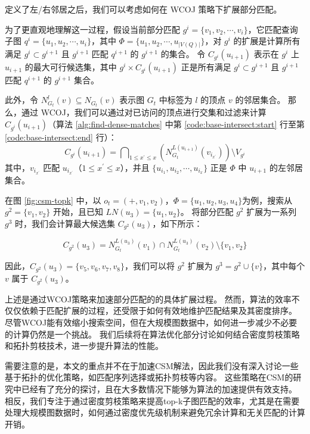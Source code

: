 定义了左/右邻居之后，我们可以考虑如何在 WCOJ 策略下扩展部分匹配。

为了更直观地理解这一过程，假设当前部分匹配 $g^i = \{v_1, v_2, \cdots, v_i\}$，它匹配查询子图 $q^i = \{u_1, u_2, \cdots, u_i\}$，其中 $\Phi = \{u_1, u_2, \cdots, u_{|V(Q)|}\}$，对 $g^i$ 的扩展是计算所有满足 $g^i \subset g^{i+1}$ 且 $g^{i+1}$ 匹配 $q^{i+1}$ 的 $g^{i+1}$ 的集合。
令 $C_{g^{i}}(u_{i+1})$ 表示在 $g^i$ 上 $u_{i+1}$ 的最大可行候选集，其中 $g^i \times C_{g^{i}}(u_{i+1})$ 正是所有满足 $g^i \subset g^{i+1}$ 且 $g^{i+1}$ 匹配 $q^{i+1}$ 的 $g^{i+1}$ 集合。

此外，令 $N_{G_t}^l(v) \subseteq N_{G_t}(v)$ 表示图 $G_t$ 中标签为 $l$ 的顶点 $v$ 的邻居集合。
那么，通过 WCOJ，我们可以通过对已访问的顶点进行交集和过滤来计算 $C_{g^{i}}(u_{i+1})$（算法 \ref{alg:find-dense-matches} 中第 \ref{code:base-intersect:start} 行至第 \ref{code:base-intersect:end} 行）：
\begin{equation} \label{equation:wcoj-intersection}
    C_{g^{i}}(u_{i+1}) = \bigcap\nolimits_{1\leq x^\prime\leq x} \left(  N_{G_t}^{L(u_{i+1})}(v_{i_{x^\prime}}) \right)  \setminus V_{g^i}
\end{equation}
其中，$v_{i_{x^\prime}}$ 匹配 $u_{i_{x^\prime}}$（$1 \leq x^\prime \leq x$），并且 $\{u_{i_1}, u_{i_2}, \cdots, u_{i_x}\}$ 正是 $\Phi$ 中 $u_{i+1}$ 的左邻居集合。

在图 \ref{fig:csm-topk} 中，以 $o_t = (+,v_1,v_2)$，$\Phi = \{u_1,u_2,u_3,u_4\}$为例，搜索从 $g^2 = \{v_1,v_2\}$ 开始，且已知 $LN(u_3) = \{u_1, u_2\}$。
将部分匹配 $g^2$ 扩展为一系列 $g^3$ 时，我们会计算最大候选集 $C_{g^{2}}(u_3)$，如下所示：

\[
	C_{g^{2}}(u_{3}) =  N_{G_t}^{L(u_{3})}(v_{1})\cap N_{G_t}^{L(u_{3})}(v_{2})  \setminus \{v_1, v_2\}
\]

因此，$C_{g^{2}}(u_3) = \{v_5, v_6, v_7, v_8\}$，我们可以将 $g^2$ 扩展为 $g^3 = g^2 \cup \{v\}$，其中每个 $v$ 属于 $C_{g^{2}}(u_3)$。

上述是通过WCOJ策略来加速部分匹配的的具体扩展过程。
然而，算法的效率不仅仅依赖于匹配扩展的过程，还受限于如何有效地维护匹配结果及其密度排序。
尽管WCOJ能有效缩小搜索空间，但在大规模图数据中，如何进一步减少不必要的计算仍然是一个挑战。
我们后续将在算法优化部分讨论如何结合密度剪枝策略和拓扑剪枝技术，进一步提升算法的性能。

需要注意的是，本文的重点并不在于加速CSM解法，因此我们没有深入讨论一些基于拓扑的优化策略，如匹配序列选择或拓扑剪枝等内容。
这些策略在CSM的研究中已经有了充分的探讨，且在大多数情况下能够为算法的加速提供有效支持。
相反，我们专注于通过密度剪枝策略来提高top-k子图匹配的效率，尤其是在需要处理大规模图数据时，如何通过密度优先级机制来避免冗余计算和无关匹配的计算开销。



